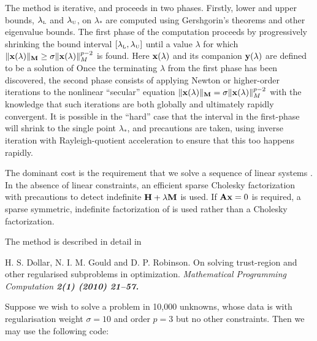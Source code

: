 \documentclass{galahad}
\begin{document}
\noindent
The method is iterative, and proceeds in two phases.
Firstly, lower and upper bounds, $\lambda_{\mbox{\protect\tiny L}}$ and
$\lambda_{\mbox{\protect\tiny U}}$, on $\lambda_*$ are computed
using Gershgorin's theorems and other eigenvalue bounds. The
first phase of the computation proceeds by progressively shrinking  the bound
interval $[\lambda_{\mbox{\protect\tiny L}},\lambda_{\mbox{\protect\tiny U}}]$
until a value $\lambda$ for which
$\|{\mathbf{x}}(\lambda)\|_{{\mathbf{M}}}  \geq  \sigma \|{\mathbf{x}}(\lambda)\|_M^{p-2}$ is found.
Here ${\mathbf{x}}(\lambda)$ and its companion ${\mathbf{y}}(\lambda)$
are defined to be a solution of
Once the terminating $\lambda$ from the first phase has been discovered,
the second phase consists of applying Newton or higher-order iterations
to the nonlinear ``secular'' equation
$\|{\mathbf{x}}(\lambda)\|_{{\mathbf{M}}} = \sigma \|{\mathbf{x}}(\lambda)\|_M^{p-2}$ with
the knowledge that such iterations are both globally and ultimately
rapidly convergent. It is possible in the ``hard'' case that the
interval in the first-phase will shrink to the single point $\lambda_*$,
and precautions are taken, using inverse iteration with Rayleigh-quotient
acceleration to ensure that this too happens rapidly.

The dominant cost is the requirement that we solve a sequence of linear systems
. In the absence of linear constraints, an
efficient sparse Cholesky factorization with precautions to
detect indefinite ${\mathbf{H}} + \lambda {\mathbf{M}}$ is used. If ${\mathbf{A}} {\mathbf{x}}  = 0$ is required,
a sparse symmetric, indefinite factorization of  is used
rather than a Cholesky factorization.

\galreference
The method is described in detail in
\vspace*{1mm}

\noindent
H. S. Dollar, N. I. M. Gould and D. P. Robinson.
On solving trust-region and other regularised subproblems in optimization.
\em Mathematical Programming Computation \bf 2(1) \rm (2010) 21--57.


\galexample
Suppose we wish to solve a problem in 10,000 unknowns, whose data is
with regularisation weight $\sigma = 10$ and order $p = 3$
but no other constraints. Then we may use the following code:
\end{document}
